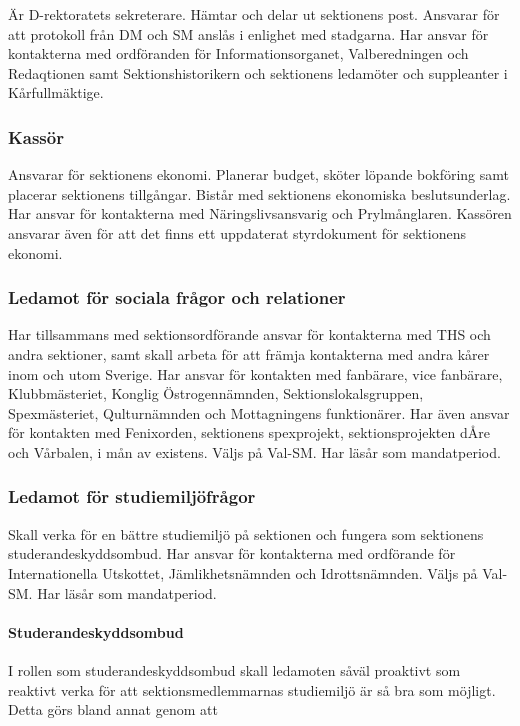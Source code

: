\documentclass[a4paper,12pt]{article}
\begin{document}
Är D-rektoratets sekreterare. Hämtar och delar ut sektionens post. Ansvarar för att protokoll från DM och SM anslås i enlighet med stadgarna. Har ansvar för kontakterna med ordföranden för Informationsorganet, Valberedningen och Redaqtionen samt Sektionshistorikern och sektionens ledamöter och suppleanter i Kårfullmäktige.

\subsubsection{Kassör}

Ansvarar för sektionens ekonomi. Planerar budget, sköter löpande bokföring samt placerar sektionens tillgångar. Bistår med sektionens ekonomiska beslutsunderlag. Har ansvar för kontakterna med Näringslivsansvarig och Prylmånglaren. Kassören ansvarar även för att det finns ett uppdaterat styrdokument för sektionens ekonomi.

\subsubsection{Ledamot för sociala frågor och relationer}

Har tillsammans med sektionsordförande ansvar för kontakterna med THS och andra sektioner,
samt skall arbeta för att främja kontakterna med andra kårer inom och utom Sverige.
Har ansvar för kontakten med fanbärare, vice fanbärare, Klubbmästeriet, Konglig Östrogennämnden,
Sektionslokalsgruppen, Spexmästeriet, Qulturnämnden och Mottagningens funktionärer.
Har även ansvar för kontakten med Fenixorden, sektionens spexprojekt, sektionsprojekten dÅre och Vårbalen, i mån av existens.
Väljs på Val-SM. Har läsår som mandatperiod.

\subsubsection{Ledamot för studiemiljöfrågor}

Skall verka för en bättre studiemiljö på sektionen och fungera som sektionens
studerandeskyddsombud. Har ansvar för kontakterna med ordförande för Internationella Utskottet, Jämlikhetsnämnden och Idrottsnämnden. Väljs på Val-SM. Har läsår som mandatperiod.

\paragraph{Studerandeskyddsombud}

I rollen som studerandeskyddsombud skall ledamoten såväl proaktivt som reaktivt verka för att sektionsmedlemmarnas studiemiljö är så bra som möjligt. Detta görs bland annat genom att
\end{document}
